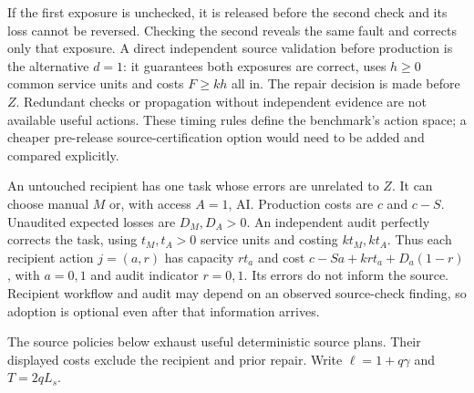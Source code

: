 \documentclass[
  11pt,
  a4paper,
]{article}
\begin{document}
If the first exposure is unchecked, it is released before the second
check and its loss cannot be reversed. Checking the second reveals the
same fault and corrects only that exposure. A direct independent source
validation before production is the alternative \(d=1\): it guarantees
both exposures are correct, uses \(h\geq0\) common service units and
costs \(F\geq kh\) all in. The repair decision is made before \(Z\).
Redundant checks or propagation without independent evidence are not
available useful actions. These timing rules define the benchmark's
action space; a cheaper pre-release source-certification option would
need to be added and compared explicitly.

An untouched recipient has one task whose errors are unrelated to \(Z\).
It can choose manual \(M\) or, with access \(A=1\), AI. Production costs
are \(c\) and \(c-S\). Unaudited expected losses are \(D_M,D_A>0\). An
independent audit perfectly corrects the task, using \(t_M,t_A>0\)
service units and costing \(kt_M,kt_A\). Thus each recipient action
\(j=(a,r)\) has capacity \(r t_a\) and cost \(c-Sa+kr t_a+D_a(1-r)\),
with \(a=0,1\) and audit indicator \(r=0,1\). Its errors do not inform
the source. Recipient workflow and audit may depend on an observed
source-check finding, so adoption is optional even after that
information arrives.

The source policies below exhaust useful deterministic source plans.
Their displayed costs exclude the recipient and prior repair. Write
\(\ell=1+q\gamma\) and \(T=2qL_s\).

\newpage
\end{document}

